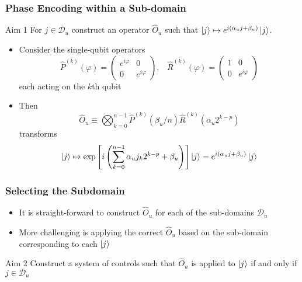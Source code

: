 \documentclass{beamer}
\begin{document}
\begin{frame}

\frametitle{Phase Encoding within a Sub-domain}

\begin{block}{Aim 1}
For $j \in \mathcal{D}_u$ construct an \alert{operator $\hat{O}_u$} such that $\ket{j} \mapsto e^{i (\alpha_u j + \beta_u )} \ket{j}$. 
\end{block}

\begin{itemize}
\item Consider the single-qubit operators 
\begin{equation}
\hat{P}^{(k)}(\varphi) = \begin{pmatrix}
e^{i \varphi} & 0 \\ 0 & e^{i \varphi}
\end{pmatrix}, \; \; \; \hat{R}^{(k)}(\varphi) = \begin{pmatrix}
1 & 0 \\ 0 & e^{i \varphi}
\end{pmatrix}
\end{equation}
each acting on the $k$th qubit
\item Then \alert{
\begin{equation}
\hat{O}_u \equiv \bigotimes^{n-1}_{k=0} \hat{P}^{(k)} (\beta_u / n) \hat{R}^{(k)} \left( \alpha_u 2^{k-p} \right)
\end{equation}}
transforms 
\begin{equation}
\ket{j} \mapsto \exp \left[ i \left( \sum_{k=0}^{n-1} \alpha_u j_k 2^{k-p} + \beta_u \right) \right] \ket{j} = e^{i (\alpha_u j + \beta_u )} \ket{j}
\end{equation}
\end{itemize}
\end{frame}

\begin{frame}
\frametitle{Selecting the Subdomain}
\begin{itemize}
\item It is straight-forward to construct $\hat{O}_u$ for each of the sub-domains $\mathcal{D}_u$ 
\item More challenging is \alert{applying the correct $\hat{O}_u$} based on the sub-domain corresponding to each $\ket{j}$
\end{itemize}
\begin{block}{Aim 2}
Construct a \alert{system of controls} such that $\hat{O}_u$ is applied to $\ket{j}$ if and only if $j \in \mathcal{D}_u$
\end{block}
\end{frame}
\end{document}
